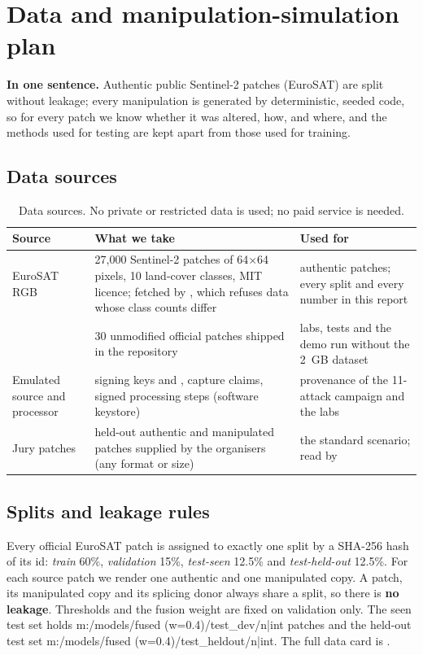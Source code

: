 \section{Data and manipulation-simulation plan}\label{sec:data}
\begin{keybox}
\textbf{In one sentence.} Authentic public Sentinel-2 patches (EuroSAT) are split without leakage; every manipulation is generated by deterministic, seeded code, so for every patch we know whether it was altered, how, and where, and the methods used for testing are kept apart from those used for training.
\end{keybox}

\subsection{Data sources}
\begin{table}[!htbp]
\centering\small
\begin{tabularx}{\textwidth}{|L{3.6cm}|Y|L{3.6cm}|}
\hline
\textbf{Source} & \textbf{What we take} & \textbf{Used for}\\
\hline
EuroSAT RGB \cite{eurosat} & 27,000 Sentinel-2 patches of 64$\times$64 pixels, 10 land-cover classes, MIT licence; fetched by , which refuses data whose class counts differ & authentic patches; every split and every number in this report\\
\hline
{} & 30 unmodified official patches shipped in the repository & labs, tests and the demo run without the 2~GB dataset\\
\hline
Emulated source and processor & signing keys  and , capture claims, signed processing steps (software keystore) & provenance of the 11-attack campaign and the labs\\
\hline
Jury patches & held-out authentic and manipulated patches supplied by the organisers (any format or size) & the standard scenario; read by \\
\hline
\end{tabularx}
\caption{Data sources. No private or restricted data is used; no paid service is needed.}
\end{table}

\subsection{Splits and leakage rules}
Every official EuroSAT patch is assigned to exactly one split by a SHA-256 hash of its id: \emph{train} 60\%, \emph{validation} 15\%, \emph{test-seen} 12.5\% and \emph{test-held-out} 12.5\%. For each source patch we render one authentic and one manipulated copy. A patch, its manipulated copy and its splicing donor always share a split, so there is \textbf{no leakage}. Thresholds and the fusion weight are fixed on validation only. The seen test set holds {{m:/models/fused (w=0.4)/test_dev/n|int}} patches and the held-out test set {{m:/models/fused (w=0.4)/test_heldout/n|int}}. The full data card is .

